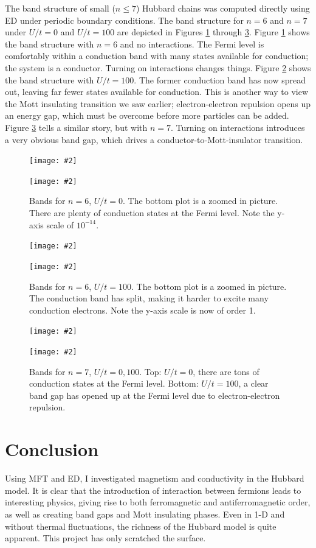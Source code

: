 \documentclass{article}
\newcommand{\nicegraphic}[2][1]{
	\begin{center}
		\texttt{[image: \#2]}
	\end{center}
}
\begin{document}
The band structure of small ($n \leq 7$) Hubbard chains was computed directly using ED under periodic boundary conditions. The band structure for $n = 6$ and $n = 7$ under $U/t = 0$ and $U/t = 100$ are depicted in Figures \ref{fig:band60} through \ref{fig:band7}. Figure \ref{fig:band60} shows the band structure with $n = 6$ and no interactions. The Fermi level is comfortably within a conduction band with many states available for conduction; the system is a conductor. Turning on interactions changes things. Figure \ref{fig:band6100} shows the band structure with $U/t = 100$. The former conduction band has now spread out, leaving far fewer states available for conduction. This is another way to view the Mott insulating transition we saw earlier; electron-electron repulsion opens up an energy gap, which must be overcome before more particles can be added. Figure \ref{fig:band7} tells a similar story, but with $n = 7$. Turning on interactions introduces a very obvious band gap, which drives a conductor-to-Mott-insulator transition.

\begin{figure}
\nicegraphic[0.9]{fermi_hubbard_bands_n6_U0_t1}
\nicegraphic[0.9]{fermi_hubbard_bands_zoomed_n6_U0_t1}
\caption{Bands for $n = 6$, $U/t = 0$. The bottom plot is a zoomed in picture. There are plenty of conduction states at the Fermi level. Note the y-axis scale of $10^{-14}$.}
\label{fig:band60}
\end{figure}
\begin{figure}
\nicegraphic[0.9]{fermi_hubbard_bands_n6_U100_t1}
\nicegraphic[0.9]{fermi_hubbard_bands_zoomed_n6_U100_t1}
\caption{Bands for $n = 6$, $U/t = 100$. The bottom plot is a zoomed in picture. The conduction band has split, making it harder to excite many conduction electrons. Note the y-axis scale is now of order 1.}
\label{fig:band6100}
\end{figure}
\begin{figure}
\nicegraphic[0.9]{fermi_hubbard_bands_n7_U0_t1}
\nicegraphic[0.9]{fermi_hubbard_bands_n7_U100_t1}
\caption{Bands for $n = 7$, $U/t = 0, 100$. Top: $U/t = 0$, there are tons of conduction states at the Fermi level. Bottom: $U/t = 100$, a clear band gap has opened up at the Fermi level due to electron-electron repulsion.}
\label{fig:band7}
\end{figure}

\section{Conclusion}
Using MFT and ED, I investigated magnetism and conductivity in the Hubbard model. It is clear that the introduction of interaction between fermions leads to interesting physics, giving rise to both ferromagnetic and antiferromagnetic order, as well as creating band gaps and Mott insulating phases. Even in 1-D and without thermal fluctuations, the richness of the Hubbard model is quite apparent. This project has only scratched the surface.
\end{document}
